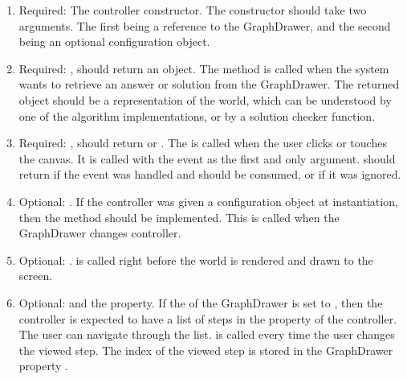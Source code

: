 \begin{enumerate}
    \item Required: The controller constructor. The constructor should take two arguments. The first being a reference to the GraphDrawer, and the second being an optional configuration object.
    \item Required: , should return an object. The  method is called when the system wants to retrieve an answer or solution from the GraphDrawer. The returned object should be a representation of the world, which can be understood by one of the algorithm implementations, or by a solution checker function.
    \item Required: , should return  or . The  is called when the user clicks or touches the canvas. It is called with the event as the first and only argument.  should return  if the event was handled and should be consumed, or  if it was ignored.
    \item Optional: . If the controller was given a configuration object at instantiation, then the  method should be implemented. This is called when the GraphDrawer changes controller.
    \item Optional: .  is called right before the world is rendered and drawn to the screen.
    \item Optional:  and the  property. If the  of the GraphDrawer is set to , then the controller is expected to have a list of steps in the  property of the controller. The user can navigate through the list.  is called every time the user changes the viewed step. The index of the viewed step is stored in the GraphDrawer property .
\end{enumerate}








